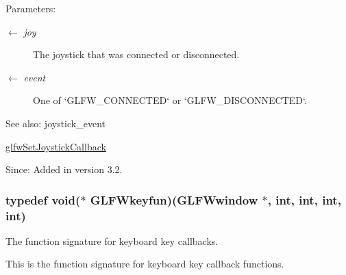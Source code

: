 \begin{Desc}
\item[Parameters:]
\begin{description}
\item[\mbox{$\leftarrow$} {\em joy}]The joystick that was connected or disconnected. \item[\mbox{$\leftarrow$} {\em event}]One of `GLFW\_\-CONNECTED` or `GLFW\_\-DISCONNECTED`.\end{description}
\end{Desc}
\begin{Desc}
\item[See also:]joystick\_\-event 

\hyperlink{group__input_g07524a1122a03642b1d28822ea931094}{glfwSetJoystickCallback}\end{Desc}
\begin{Desc}
\item[Since:]Added in version 3.2. \end{Desc}
\hypertarget{group__input_g592dd1919f8a1dc7576b13cdd8b7b695}{
\subsubsection[GLFWkeyfun]{\setlength{\rightskip}{0pt plus 5cm}typedef void($\ast$  {\bf GLFWkeyfun})({\bf GLFWwindow} $\ast$, int, int, int, int)}}
\label{group__input_g592dd1919f8a1dc7576b13cdd8b7b695}


The function signature for keyboard key callbacks. 

This is the function signature for keyboard key callback functions.

